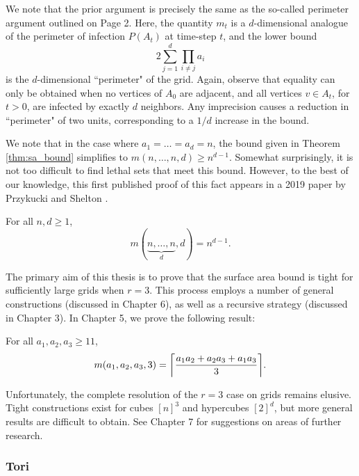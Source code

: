 We note that the prior argument is precisely the same as the so-called perimeter argument outlined on Page 2. Here, the quantity $m_t$ is a $d$-dimensional analogue of the perimeter of infection $P(A_t)$ at time-step $t$, and the lower bound
$$2\sum_{j=1}^d \prod_{i \neq j} a_i$$
is the $d$-dimensional ``perimeter" of the grid. Again, observe that equality can only be obtained when no vertices of $A_0$ are adjacent, and all vertices $v \in A_{t}$, for $t>0$, are infected by exactly $d$ neighbors. Any imprecision causes a reduction in ``perimeter" of two units, corresponding to a $1/d$ increase in the bound. 

We note that in the case where $a_1 = \dots = a_d = n$, the bound given in Theorem \ref{thm:sa_bound} simplifies to $m(n, \dots,n,d) \geq n^{d-1}$. Somewhat surprisingly, it is not too difficult to find lethal sets that meet this bound. However, to the best of our knowledge, this first published proof of this fact appears in a 2019 paper by Przykucki and Shelton \cite{przykucki:2019}. 

\begin{thm}
\label{thm:hypercubes}
For all $n,d \geq 1$,
$$m(\underbrace{n,\dots,n}_d,d) = n^{d-1}.$$
\end{thm}

The primary aim of this thesis is to prove that the surface area bound is tight for sufficiently large grids when $r=3$. This process employs a number of general constructions (discussed in Chapter 6), as well as a recursive strategy (discussed in Chapter 3). In Chapter 5, we prove the following result:

\begin{thm}
\label{thm:main_result}
For all $a_1, a_2, a_3 \geq 11$, 
$$m(a_1,a_2,a_3,3) = \ceil*{\frac{a_1a_2+a_2a_3+a_1a_3}{3}}.$$
\end{thm}

Unfortunately, the complete resolution of the $r=3$ case on grids remains elusive. Tight constructions exist for cubes $[n]^3$ and hypercubes $[2]^d$, but more general results are difficult to obtain. See Chapter 7 for suggestions on areas of further research.

\subsubsection{Tori}


